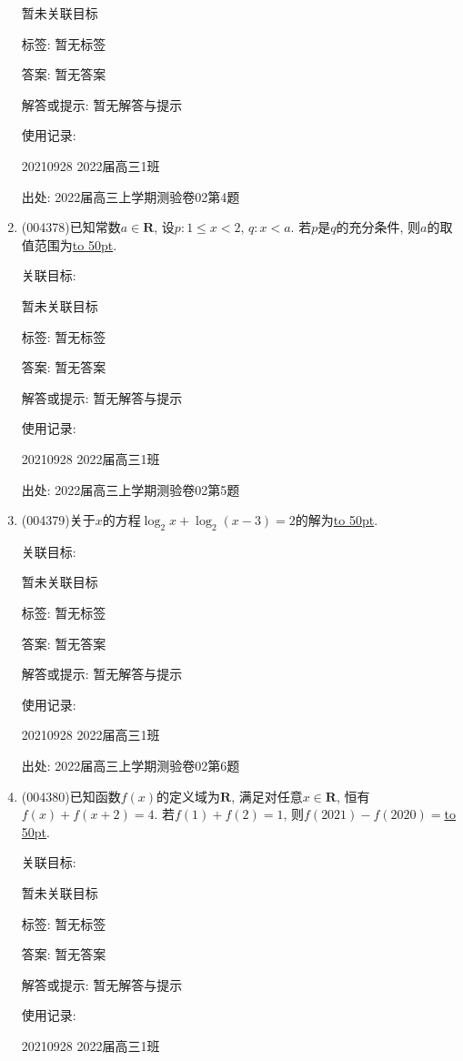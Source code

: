 \documentclass[10pt,a4paper]{article}
\newcommand{\blank}[1]{\underline{\hbox to #1pt{}}}
\begin{document}
\begin{enumerate}[1.]
暂未关联目标



标签: 暂无标签

答案: 暂无答案

解答或提示: 暂无解答与提示

使用记录:

20210928	2022届高三1班	


出处: 2022届高三上学期测验卷02第4题
\item { (004378)}已知常数$a\in \mathbf{R}$, 设$p:1\le x<2$, $q:x<a$. 若$p$是$q$的充分条件, 则$a$的取值范围为\blank{50}.


关联目标:

暂未关联目标



标签: 暂无标签

答案: 暂无答案

解答或提示: 暂无解答与提示

使用记录:

20210928	2022届高三1班	


出处: 2022届高三上学期测验卷02第5题
\item { (004379)}关于$x$的方程$\log_2 x+\log_2(x-3)=2$的解为\blank{50}.


关联目标:

暂未关联目标



标签: 暂无标签

答案: 暂无答案

解答或提示: 暂无解答与提示

使用记录:

20210928	2022届高三1班	


出处: 2022届高三上学期测验卷02第6题
\item { (004380)}已知函数$f(x)$的定义域为$\mathbf{R}$, 满足对任意$x\in \mathbf{R}$, 恒有$f(x)+f(x+2)=4$. 若$f(1)+f(2)=1$, 则$f(2021)-f(2020)=$\blank{50}.


关联目标:

暂未关联目标



标签: 暂无标签

答案: 暂无答案

解答或提示: 暂无解答与提示

使用记录:

20210928	2022届高三1班	



\end{enumerate}
\end{document}
